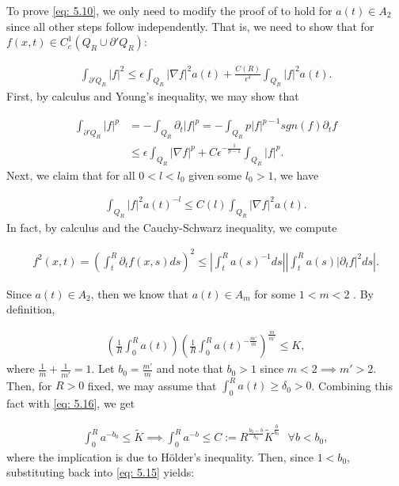 \documentclass{article}
\begin{document}
To prove \eqref{eq: 5.10}, we only need to modify the proof of \cite[Lemma 2.3]{tan} to hold for $a(t) \in A_2$ since all other steps follow independently. That is, we need to show that for $f(x,t) \in C^1_c(Q_R \cup \partial'Q_R)$:

\begin{align*}
    \int_{\partial'Q_R}|f|^2 \le \epsilon \int_{Q_R}|\nabla f|^2a(t) + \frac{C(R)}{\epsilon^{\delta}}\int_{Q_R}|f|^2a(t).
    \tag{5.12}\label{eq: 5.12}
\end{align*}
First, by calculus and Young's inequality, we may show that

\begin{align*}
    \int_{\partial'Q_R}|f|^p &= - \int_{Q_R}\partial_t|f|^p = -\int_{Q_R}p|f|^{p-1}sgn(f)\partial_t f  \\
    & \le \epsilon \int_{Q_R} |\nabla f|^p + C\epsilon^{-\frac{1}{p-1}}\int_{Q_R}|f|^p.
    \tag{5.13}\label{eq: 5.13}
\end{align*}
Next, we claim that for all $0<l<l_0$ given some $l_0>1$, we have

\begin{align*}
    \int_{Q_R}|f|^2 a(t)^{-l} \le C(l) \int_{Q_R} |\nabla f|^2 a(t).
    \tag{5.14}\label{eq: 5.14}
\end{align*}
In fact, by calculus and the Cauchy-Schwarz inequality, we compute

\begin{align*}
    f^2(x,t) = \left(\int_t^{R} \partial_t f(x,s) ds\right)^2 \le \left|\int_{t}^{R}a(s)^{-1}ds\right|\left|\int_{t}^{R}a(s)|\partial_t f|^2 ds\right|.
    \tag{5.15}\label{eq: 5.15}
\end{align*}

Since $a(t) \in A_2$, then we know that $a(t) \in A_m$ for some $1<m<2$ \cite[Lemma 5]{muckenhoupt}. By definition,

\begin{align*}
    \left(\frac{1}{R}\int_{0}^{R}a(t)\right)\left(\frac{1}{R}\int_{0}^{R}a(t)^{-\frac{m'}{m}}\right)^{\frac{m}{m'}} \le K,
    \tag{5.16}\label{eq: 5.16}
\end{align*}
where $\frac{1}{m}+\frac{1}{m'}=1$. Let $b_0 = \frac{m'}{m}$ and note that $b_0>1$ since $m<2 \implies m' >2$. Then, for $R>0$ fixed, we may assume that $\int_0^R a(t) \ge \delta_0 > 0$. Combining this fact with \eqref{eq: 5.16}, we get

\begin{align*}
    \int_0^R a^{-b_0} \le \tilde{K} \implies \int_0^R a^{-b} \le C:= R^{\frac{b_0-b}{b_0}}\tilde{K}^{\frac{b}{b_0}} \textrm{  } \forall b<b_0,
    \tag{5.17}\label{eq: 5.17}
\end{align*}
where the implication is due to H\"{o}lder's inequality. Then, since $1 < b_0$, substituting back into \eqref{eq: 5.15} yields:
\end{document}
